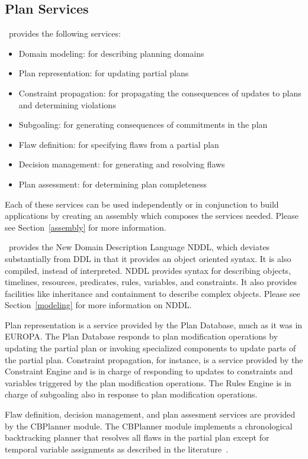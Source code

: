 \documentclass[10pt, letterpaper, twoside]{article}
\begin{document}
\subsection{Plan Services}
\label{services}
\ET\, provides the following services:
\begin{itemize}
\item Domain modeling: for describing planning domains
\item Plan representation: for updating partial plans 
\item Constraint propagation: for propagating the consequences of updates
to plans and determining violations
\item Subgoaling: for generating consequences of commitments in the plan
\item Flaw definition: for specifying flaws from a partial plan
\item Decision management: for generating and resolving flaws
\item Plan assessment: for determining plan completeness
\end{itemize}
Each of these services can be used independently or in conjunction to build
applications by creating an assembly which composes the services
needed. Please see Section~\ref{assembly} for more information.

\ET\, provides the New Domain Description Language NDDL, which deviates
substantially from DDL in that it provides an object oriented syntax.  It
is also compiled, instead of interpreted.  NDDL provides syntax for
describing objects, timelines, resources, predicates, rules, variables, and
constraints. It also provides facilities like inheritance and containment
to describe complex objects.  Please see Section~\ref{modeling} for more
information on NDDL. 

Plan representation is a service provided by the Plan Database, much as it
was in EUROPA.  The Plan Database responds to plan modification operations
by updating the partial plan or invoking specialized components to update
parts of the partial plan.  Constraint propagation, for instance, is a
service provided by the Constraint Engine and is in charge of responding to
updates to constraints and variables triggered by the plan modification
operations. The Rules Engine is in charge of subgoaling also in response to
plan modification operations. 

Flaw definition, decision management, and plan assesment services are
provided by the CBPlanner module. The CBPlanner module implements a
chronological backtracking planner that resolves all flaws in the partial
plan except for temporal variable assignments as described in the
literature~\cite{planid,europa2}.  
\end{document}
